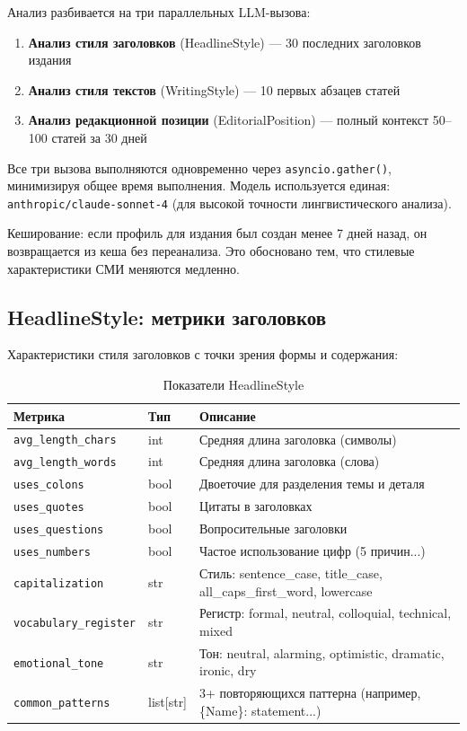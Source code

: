 Анализ разбивается на три параллельных LLM-вызова:

\begin{enumerate}
    \item \textbf{Анализ стиля заголовков} (HeadlineStyle) --- 30 последних заголовков издания
    \item \textbf{Анализ стиля текстов} (WritingStyle) --- 10 первых абзацев статей
    \item \textbf{Анализ редакционной позиции} (EditorialPosition) --- полный контекст 50--100 статей за 30 дней
\end{enumerate}

Все три вызова выполняются одновременно через \texttt{asyncio.gather()}, минимизируя общее время выполнения. Модель используется единая: \texttt{anthropic/claude-sonnet-4} (для высокой точности лингвистического анализа).

Кеширование: если профиль для издания был создан менее 7 дней назад, он возвращается из кеша без переанализа. Это обосновано тем, что стилевые характеристики СМИ меняются медленно.


\subsection{HeadlineStyle: метрики заголовков}

Характеристики стиля заголовков с точки зрения формы и содержания:

\begin{table}[h!]
\centering
\caption{Показатели HeadlineStyle}
\label{tab:headline_style}
\footnotesize
\begin{tabular}{|l|l|l|}
\hline
\textbf{Метрика} & \textbf{Тип} & \textbf{Описание} \\
\hline
\texttt{avg\_length\_chars} & int & Средняя длина заголовка (символы) \\
\texttt{avg\_length\_words} & int & Средняя длина заголовка (слова) \\
\texttt{uses\_colons} & bool & Двоеточие для разделения темы и деталя \\
\texttt{uses\_quotes} & bool & Цитаты в заголовках \\
\texttt{uses\_questions} & bool & Вопросительные заголовки \\
\texttt{uses\_numbers} & bool & Частое использование цифр (5 причин...) \\
\texttt{capitalization} & str & Стиль: sentence\_case, title\_case, all\_caps\_first\_word, lowercase \\
\texttt{vocabulary\_register} & str & Регистр: formal, neutral, colloquial, technical, mixed \\
\texttt{emotional\_tone} & str & Тон: neutral, alarming, optimistic, dramatic, ironic, dry \\
\texttt{common\_patterns} & list[str] & 3+ повторяющихся паттерна (например, \{Name\}: statement...) \\
\hline
\end{tabular}
\end{table}

